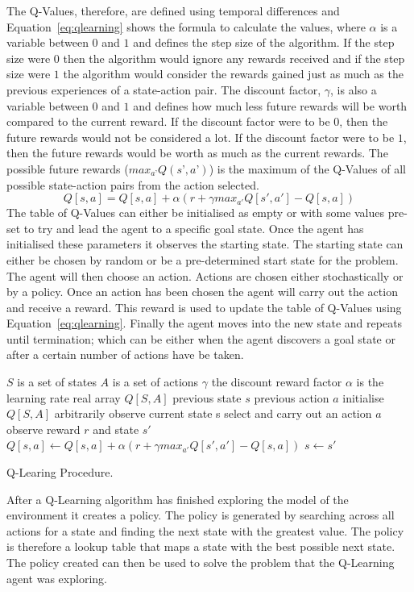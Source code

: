 The Q-Values, therefore, are defined using temporal differences and Equation~\ref{eq:qlearning} shows the formula to calculate the values, where $\alpha$ is a variable between $0$ and $1$ and defines the step size of the algorithm. If the step size were $0$ then the algorithm would ignore any rewards received and if the step size were $1$ the algorithm would consider the rewards gained just as much as the previous experiences of a state-action pair. The discount factor, $\gamma$, is also a variable between $0$ and $1$ and defines how much less future rewards will be worth compared to the current reward. If the discount factor were to be $0$, then the future rewards would not be considered a lot. If the discount factor were to be $1$, then the future rewards would be worth as much as the current rewards. The possible future rewards ($max_{a’}Q(s’,a’)$) is the maximum of the Q-Values of all possible state-action pairs from the action selected.
\begin{equation} \label{eq:qlearning}
Q[s,a] = Q[s,a] + {\alpha}(r+ {\gamma}max_{a'} Q[s',a'] - Q[s,a])
\end{equation}
The table of Q-Values can either be initialised as empty or with some values pre-set to try and lead the agent to a specific goal state. Once the agent has initialised these parameters it observes the starting state. The starting state can either be chosen by random or be a pre-determined start state for the problem. The agent will then choose an action. Actions are chosen either stochastically or by a policy. Once an action has been chosen the agent will carry out the action and receive a reward. This reward is used to update the table of Q-Values using Equation~\ref{eq:qlearning}. Finally the agent moves into the new state and repeats until termination; which can be either when the agent discovers a goal state or after a certain number of actions have be taken.
\begin{algorithm}
\begin{algorithmic}[1]
\Require
 	\Statex $S$ is a set of states
 	\Statex $A$ is a set of actions
 	\Statex $\gamma$ the discount reward factor
 	\Statex $\alpha$ is the learning rate
	\State real array $Q[S,A]$
	\State previous state $s$
	\State previous action $a$
	\State initialise $Q[S,A]$ arbitrarily
	\State observe current state s
	\Repeat
		\State select and carry out an action $a$
		\State observe reward $r$ and state $s'$
		\State $Q[s,a] \gets Q[s,a]+\alpha(r+\gamma max_{a'}Q[s',a']-Q[s,a])$
		\State $s \gets s'$
\EndProcedure
\end{algorithmic}
\caption{Q-Learing Procedure.}\label{alg:qlearning}
\end{algorithm}

After a Q-Learning algorithm has finished exploring the model of the environment it creates a policy. The policy is generated by searching across all actions for a state and finding the next state with the greatest value. The policy is therefore a lookup table that maps a state with the best possible next state. The policy created can then be used to solve the problem that the Q-Learning agent was exploring.~\cite{poole2010artificial}